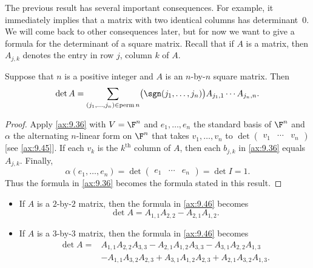 The previous result has several important consequences. For example, it
immediately implies that a matrix with two identical columns has
determinant~$0$. We will come back to other consequences later, but for now we
want to give a formula for the determinant of a square matrix. Recall that if
$A$ is a matrix, then $A_{j,k}$ denotes the entry in row $j$, column $k$ of
$A$.

\begin{result}\label{ax:9.46}
Suppose that $n$ is a positive integer and $A$ is an $n$-by-$n$ square matrix.
Then
\[ \det A = \sum_{(j_1,\dots,j_n)\in\operatorname{perm} n}
   \bigl(\sgn(j_1,\dots,j_n)\bigr)A_{j_1,1}\cdots A_{j_n,n}. \]
\end{result}

\begin{proof}
Apply \ref{ax:9.36} with $V=\F^n$ and $e_1,\dots,e_n$ the standard basis of
$\F^n$ and $\alpha$ the alternating $n$-linear form on $\F^n$ that takes
$v_1,\dots,v_n$ to $\det\begin{pmatrix} v_1 & \cdots & v_n \end{pmatrix}$ [see
\ref{ax:9.45}]. If each $v_k$ is the $k^{\text{th}}$ column of $A$, then each
$b_{j,k}$ in \ref{ax:9.36} equals $A_{j,k}$. Finally,
\[ \alpha(e_1,\dots,e_n) = \det\begin{pmatrix} e_1 & \cdots & e_n \end{pmatrix}
   = \det I = 1. \]
Thus the formula in \ref{ax:9.36} becomes the formula stated in this result.
\end{proof}

\begin{example}\label{ax:9.47}\leavevmode
\begin{itemize}
\item If $A$ is a $2$-by-$2$ matrix, then the formula in \ref{ax:9.46} becomes
  \[ \det A = A_{1,1}A_{2,2} - A_{2,1}A_{1,2}. \]
\item If $A$ is a $3$-by-$3$ matrix, then the formula in \ref{ax:9.46} becomes
  \begin{align*}
  \det A = {}&A_{1,1}A_{2,2}A_{3,3} - A_{2,1}A_{1,2}A_{3,3}
             - A_{3,1}A_{2,2}A_{1,3}\\
             &- A_{1,1}A_{3,2}A_{2,3} + A_{3,1}A_{1,2}A_{2,3}
             + A_{2,1}A_{3,2}A_{1,3}.
  \end{align*}
\end{itemize}
\end{example}

